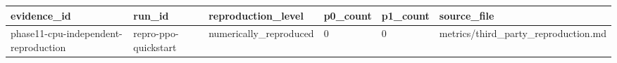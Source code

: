 \begin{tabular}{llllll}
\toprule
evidence\_id & run\_id & reproduction\_level & p0\_count & p1\_count & source\_file \\
\midrule
phase11-cpu-independent-reproduction & repro-ppo-quickstart & numerically\_reproduced & 0 & 0 & metrics/third\_party\_reproduction.md \\
\bottomrule
\end{tabular}
